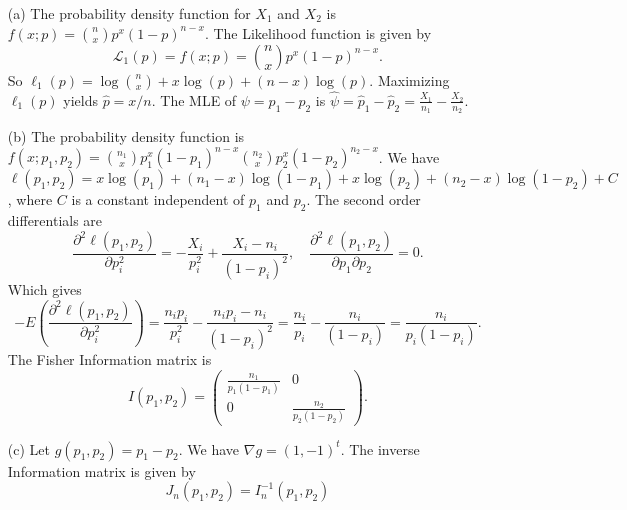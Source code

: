 \begin{itemize}
    \item[(a)] The probability density function for $X_1$ and $X_2$ is $f(x;p) = \binom{n}{x} p^x (1 - p)^{n-x}$.
        The Likelihood function is given by
        \begin{equation*}
            \mathcal{L}_1(p) = f(x;p) = \binom{n}{x} p^x (1 - p)^{n - x}.
        \end{equation*}
        So $\ell_1(p) = \log\binom{n}{x} + x\log(p) + (n - x)\log(p)$.
        Maximizing $\ell_1(p)$ yields $\hat{p} = x/n$.
        The MLE of $\psi = p_1 - p_2$ is $\hat{\psi} = \hat{p}_1 - \hat{p}_2 = \frac{X_1}{n_1} - \frac{X_2}{n_2}$.
    \item[(b)] The probability density function is $f(x;p_1,p_2) = \binom{n_1}{x} p_1^x (1 - p_1)^{n-x} \binom{n_2}{x} p_2^x (1 - p_2)^{n_2 - x}$.
        We have $\ell(p_1, p_2) = x\log(p_1) + (n_1 - x)\log(1 - p_1) + x\log(p_2) + (n_2 - x)\log(1 - p_2) + C$, where $C$ is a constant independent of $p_1$ and $p_2$.
        The second order differentials are
        \begin{equation*}
            \frac{\partial^2 \ell(p_1, p_2)}{\partial p_i^2} = -\frac{X_i}{p_i^2} + \frac{X_i - n_i}{(1 - p_i)^2}, \quad
            \frac{\partial^2 \ell(p_1, p_2)}{\partial p_1 \partial p_2} = 0.
        \end{equation*}
        Which gives
        \begin{equation*}
            -E\left(\frac{\partial^2 \ell(p_1, p_2)}{\partial p_i^2}\right)
                = \frac{n_i p_i}{p_i^2} - \frac{n_i p_i - n_i}{(1 - p_i)^2}
                = \frac{n_i}{p_i} - \frac{n_i}{(1 - p_i)}
                = \frac{n_i}{p_i(1 - p_i)}.
        \end{equation*}
        The Fisher Information matrix is
        \begin{equation*}
            I(p_1, p_2) = \left( \begin{matrix}
                \frac{n_1}{p_1(1 - p_1)} & 0 \\
                0 & \frac{n_2}{p_2(1 - p_2)}
            \end{matrix} \right).
        \end{equation*}
    \item[(c)] Let $g(p_1, p_2) = p_1 - p_2$.
        We have $\nabla g = (1, -1)^t$.
        The inverse Information matrix is given by
        \begin{equation*}
            J_n(p_1, p_2)
                = I_n^{-1}(p_1, p_2)

\end{equation*}
\end{itemize}
